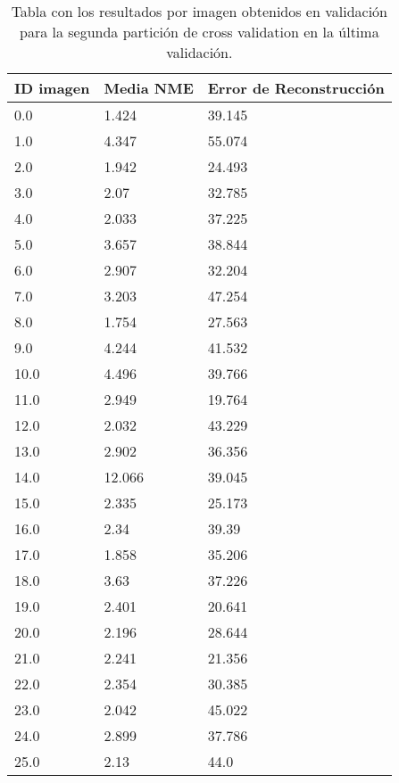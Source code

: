 \begin{table}[!ht]
    \centering
    \caption{Tabla con los resultados por imagen obtenidos en validación para la segunda partición de cross validation en la última validación.}
    \begin{tabular}{|l|l|l|}
    \hline
        ID imagen & Media NME & Error de Reconstrucción \\ \hline
        0.0 & 1.424 & 39.145 \\ \hline
        1.0 & 4.347 & 55.074 \\ \hline
        2.0 & 1.942 & 24.493 \\ \hline
        3.0 & 2.07 & 32.785 \\ \hline
        4.0 & 2.033 & 37.225 \\ \hline
        5.0 & 3.657 & 38.844 \\ \hline
        6.0 & 2.907 & 32.204 \\ \hline
        7.0 & 3.203 & 47.254 \\ \hline
        8.0 & 1.754 & 27.563 \\ \hline
        9.0 & 4.244 & 41.532 \\ \hline
        10.0 & 4.496 & 39.766 \\ \hline
        11.0 & 2.949 & 19.764 \\ \hline
        12.0 & 2.032 & 43.229 \\ \hline
        13.0 & 2.902 & 36.356 \\ \hline
        14.0 & 12.066 & 39.045 \\ \hline
        15.0 & 2.335 & 25.173 \\ \hline
        16.0 & 2.34 & 39.39 \\ \hline
        17.0 & 1.858 & 35.206 \\ \hline
        18.0 & 3.63 & 37.226 \\ \hline
        19.0 & 2.401 & 20.641 \\ \hline
        20.0 & 2.196 & 28.644 \\ \hline
        21.0 & 2.241 & 21.356 \\ \hline
        22.0 & 2.354 & 30.385 \\ \hline
        23.0 & 2.042 & 45.022 \\ \hline
        24.0 & 2.899 & 37.786 \\ \hline
        25.0 & 2.13 & 44.0 \\ \hline
    \end{tabular}
    \label{table:Encode_images_2}

\end{table}

